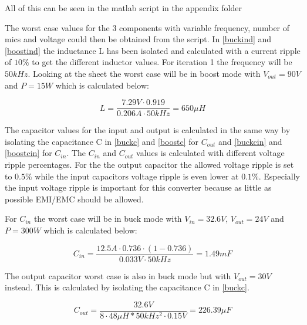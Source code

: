 All of this can be seen in the matlab script in the appendix folder  

The worst case values for the 3 components with variable frequency, number of mics and voltage could then be obtained from the script. 
In \ref{buckind} and \ref{boostind} the inductance L has been isolated and calculated with a current ripple of $10\%$ to get the different inductor values. For iteration 1 the frequency will be $50kHz$. Looking at the sheet the worst case will be in boost mode with $V_{out}=90V$ and $P=15W$ 
which is calculated below:

\begin{equation}\label{buckind}
L = \frac{7.29V\cdot 0.919}{0.206A\cdot 50kHz} = 650\mu H
\end{equation} 

The capacitor values for the input and output is calculated in the same way by isolating the capacitance C in \ref{buckc} and \ref{boostc} for $C_{out}$ and \ref{buckcin} and \ref{boostcin} for $C_{in}$.
The $C_{in}$ and $C_{out}$ values is calculated with different voltage ripple percentages. For the the output capacitor the allowed voltage ripple is set to $0.5\%$ while the input capacitors voltage ripple is even lower at $0.1\%$. 
 Especially the input voltage ripple is important for this converter because as little as possible EMI/EMC should be allowed.  

For $C_{in}$ the worst case will be in buck mode with $V_{in}=32.6V$, $V_{out}=24V$ and $P=300W$ which is calculated below:

\begin{equation}
C_{in} = \frac{12.5A\cdot 0.736\cdot (1-0.736)}{0.033V\cdot 50kHz} = 1.49mF
\end{equation}    

The output capacitor worst case is also in buck mode but with $V_{out}=30V$  instead. This is calculated by isolating the capacitance C in \ref{buckc}. 

\begin{equation} \label{buckc} 
C_{out} = \frac{32.6V}{8\cdot 48\mu H*50kHz^2\cdot 0.15V} = 226.39\mu F
\end{equation}
   

